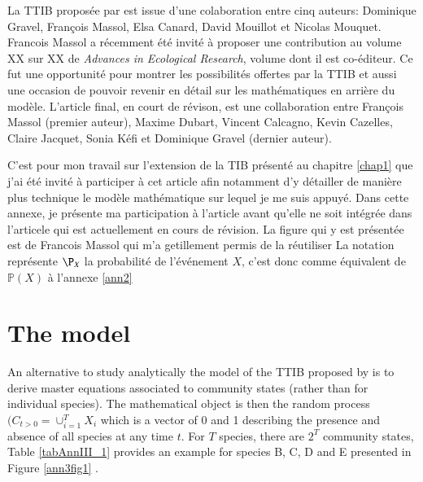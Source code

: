 \label{annIII}
\addtocounter{chapter}{1}
\setcounter{equation}{0}


La TTIB proposée par \cite{Gravel2011} est issue d'une colaboration entre cinq auteurs:
Dominique Gravel, François Massol, Elsa Canard, David Mouillot et Nicolas Mouquet.
Francois Massol a récemment été invité à proposer une contribution au volume XX sur XX de
\emph{Advances in Ecological Research}, volume dont il est co-éditeur.
Ce fut une opportunité pour montrer les possibilités offertes par la TTIB et aussi
une occasion de pouvoir revenir en détail sur les mathématiques en arrière du modèle.
L'article final, en court de révison, est une collaboration entre François Massol (premier auteur),
Maxime Dubart, Vincent Calcagno, Kevin Cazelles, Claire Jacquet, Sonia Kéfi et Dominique Gravel (dernier auteur).

C'est pour mon travail sur l'extension de la TIB présenté au chapitre \ref{chap1}
que j'ai été invité à participer à cet article afin notamment d'y détailler de manière
plus technique le modèle mathématique sur lequel je me suis appuyé.
Dans cette annexe, je présente ma participation à l'article avant qu'elle ne soit intégrée
dans l'articele qui est actuellement en cours de révision.
La figure qui y est présentée est de Francois Massol qui m'a getillement permis de la réutiliser
La notation représente $\P_{X}$ la probabilité de l'événement $X$, c'est donc
comme équivalent de $\mathbb{P}(X)$ à l'annexe \ref{ann2}



\section{The model}\label{the-model}

An alternative to study analytically the model of the TTIB proposed by \cite{Gravel2011} is to derive
master equations associated to community states (rather than for individual species).
The mathematical object is then the random process
$(C_{t>0}=\cup_{i=1}^TX_i$ which is a vector of 0 and 1 describing
the presence and absence of all species at any time \(t\). For \(T\)
species, there are \(2^T\) community states, Table \ref{tabAnnIII_1} provides an example
for species B, C, D and E presented in Figure \ref{ann3fig1} .


